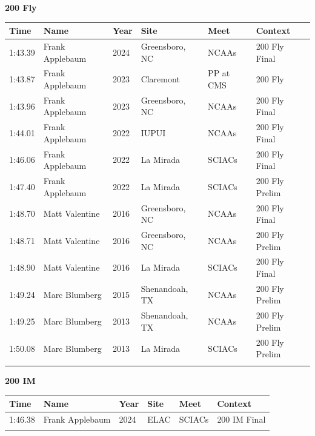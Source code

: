 \noindent\begin{minipage}[t]{0.98\textwidth}
\centering
\textbf{\textcolor{teamprimary}{200 Fly}}\par
\vspace{0.5em}
\centering
\small
\renewcommand{\arraystretch}{1.0}
\setlength{\tabcolsep}{4pt}
\begin{tabular}{@{}p{2.0cm}p{3.2cm}p{1.2cm}p{2.0cm}p{2.0cm}p{2.5cm}@{}}
\toprule
\textbf{Time} & \textbf{Name} & \textbf{Year} & \textbf{Site} & \textbf{Meet} & \textbf{Context} \\
\midrule
1:43.39 & Frank Applebaum & 2024 & Greensboro, NC & NCAAs & 200 Fly Final \\
1:43.87 & Frank Applebaum & 2023 & Claremont & PP at CMS & 200 Fly \\
1:43.96 & Frank Applebaum & 2023 & Greensboro, NC & NCAAs & 200 Fly Final \\
1:44.01 & Frank Applebaum & 2022 & IUPUI & NCAAs & 200 Fly Final \\
1:46.06 & Frank Applebaum & 2022 & La Mirada & SCIACs & 200 Fly Final \\
1:47.40 & Frank Applebaum & 2022 & La Mirada & SCIACs & 200 Fly Prelim \\
1:48.70 & Matt Valentine & 2016 & Greensboro, NC & NCAAs & 200 Fly Final \\
1:48.71 & Matt Valentine & 2016 & Greensboro, NC & NCAAs & 200 Fly Prelim \\
1:48.90 & Matt Valentine & 2016 & La Mirada & SCIACs & 200 Fly Final \\
1:49.24 & Marc Blumberg & 2015 & Shenandoah, TX & NCAAs & 200 Fly Prelim \\
1:49.25 & Marc Blumberg & 2013 & Shenandoah, TX & NCAAs & 200 Fly Prelim \\
1:50.08 & Marc Blumberg & 2013 & La Mirada & SCIACs & 200 Fly Prelim \\
\bottomrule
\vspace{0.5em}
\end{tabular}
\end{minipage}
\vspace{1.2em}
\noindent\begin{minipage}[t]{0.98\textwidth}
\centering
\textbf{\textcolor{teamprimary}{200 IM}}\par
\vspace{0.5em}
\centering
\small
\renewcommand{\arraystretch}{1.0}
\setlength{\tabcolsep}{4pt}
\begin{tabular}{@{}p{2.0cm}p{3.2cm}p{1.2cm}p{2.0cm}p{2.0cm}p{2.5cm}@{}}
\toprule
\textbf{Time} & \textbf{Name} & \textbf{Year} & \textbf{Site} & \textbf{Meet} & \textbf{Context} \\
\midrule
1:46.38 & Frank Applebaum & 2024 & ELAC & SCIACs & 200 IM Final \\
\bottomrule
\vspace{0.5em}
\end{tabular}
\end{minipage}
